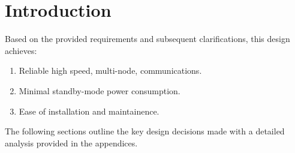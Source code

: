 \section{Introduction}

Based on the provided requirements and subsequent clarifications, this design achieves:
\begin{enumerate}
	\item Reliable high speed, multi-node, communications.
	\item Minimal standby-mode power consumption.
	\item Ease of installation and maintainence. 
\end{enumerate}

The following sections outline the key design decisions made with a detailed analysis provided in the appendices. 
